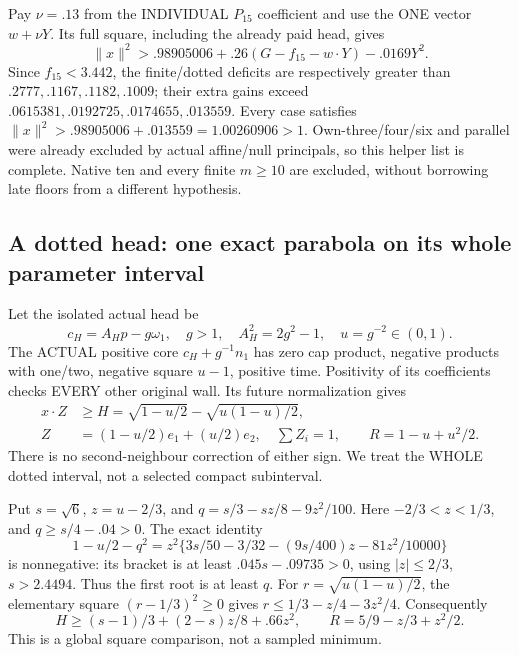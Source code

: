 \documentclass[11pt]{article}
\theoremstyle{definition}
\theoremstyle{remark}
\begin{document}
Pay \(\nu=.13\) from the INDIVIDUAL \(P_{15}\) coefficient and use
the ONE vector \(w+\nu Y\).
Its full square, including the already paid head, gives
\[
              \|x\|^2>.98905006+.26(G-f_{15}-w\cdot Y)-.0169Y^2 .
\]
Since \(f_{15}<3.442\), the finite/dotted deficits are respectively
greater than \(.2777,.1167,.1182,.1009\); their extra gains exceed
\(.0615381,.0192725,.0174655,.013559\).
Every case satisfies
\(\|x\|^2>.98905006+.013559=1.00260906>1\).
Own-three/four/six and parallel were already excluded by actual
affine/null principals, so this helper list is complete.
Native ten and every finite \(m\ge10\) are excluded, without borrowing
late floors from a different hypothesis.

\subsection{A dotted head: one exact parabola on its whole parameter interval}
\label{app:exact19:Ddottedhead}

Let the isolated actual head be
\[
 c_H=A_Hp-g\omega_1,\quad g>1,\quad A_H^2=2g^2-1,\quad
                                       u=g^{-2}\in(0,1).
\]
The ACTUAL positive core \(c_H+g^{-1}n_1\) has zero cap product,
negative products with one/two, negative square \(u-1\), positive time.
Positivity of its coefficients checks EVERY other original wall.
Its future normalization gives
\[
\begin{split}
 x\cdot Z&\ge H=\sqrt{1-u/2}-\sqrt{u(1-u)/2},\\
 Z&=(1-u/2)e_1+(u/2)e_2,\quad\sum Z_i=1,\qquad R=1-u+u^2/2 .
\end{split}
\]
There is no second-neighbour correction of either sign.
We treat the WHOLE dotted interval, not a selected compact subinterval.

Put \(s=\sqrt6\), \(z=u-2/3\), and
\(q=s/3-sz/8-9z^2/100\).
Here \(-2/3<z<1/3\), and \(q\ge s/4-.04>0\).
The exact identity
\[
 1-u/2-q^2
   =z^2\{3s/50-3/32-(9s/400)z-81z^2/10000\}
\]
is nonnegative: its bracket is at least
\(.045s-.09735>0\), using \(|z|\le2/3\), \(s>2.4494\).
Thus the first root is at least \(q\).
For \(r=\sqrt{u(1-u)/2}\), the elementary square
\((r-1/3)^2\ge0\) gives \(r\le1/3-z/4-3z^2/4\).
Consequently
\[
 H\ge(s-1)/3+(2-s)z/8+.66z^2,\qquad
 R=5/9-z/3+z^2/2 .
\tag{D19headparabola}\label{app:exact19:eq:Dheadparabola}
\]
This is a global square comparison, not a sampled minimum.
\end{document}
